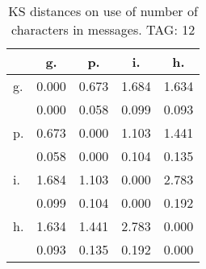 \begin{table}[h!]
\begin{center}
\begin{tabular}{| l | c | c | c | c |}\hline
 & g. & p. & i. & h. \\\hline
g. & 0.000  & 0.673  & 1.684  & 1.634 \\\hline
 & 0.000  & 0.058  & 0.099  & 0.093 \\\hline
p. & 0.673  & 0.000  & 1.103  & 1.441 \\\hline
 & 0.058  & 0.000  & 0.104  & 0.135 \\\hline
i. & 1.684  & 1.103  & 0.000  & 2.783 \\\hline
 & 0.099  & 0.104  & 0.000  & 0.192 \\\hline
h. & 1.634  & 1.441  & 2.783  & 0.000 \\\hline
 & 0.093  & 0.135  & 0.192  & 0.000 \\\hline
\end{tabular}
\caption{KS distances on use of number of characters in messages. TAG: 12}
\end{center}
\end{table}